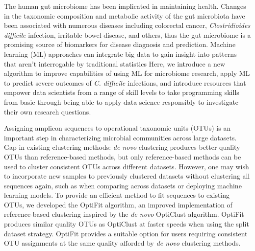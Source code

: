 The human gut microbiome has been implicated in maintaining health.
Changes in the taxonomic composition and metabolic activity of the gut
microbiota have been associated with numerous diseases including colorectal
cancer, \textit{Clostridioides difficile} infection, irritable bowel disease,
and others,
thus the gut microbiome is a promising source of biomarkers for disease
diagnosis and prediction.
Machine learning (ML) approaches can integrate big data to gain insight into
patterns that aren't interrogable by traditional statistics
Here, we introduce a new algorithm to improve capabilities of using ML for
microbiome research,
apply ML to predict severe outcomes of \textit{C. difficile} infections,
and introduce resources that empower data scientists from a range of skill
levels to take programming skills from basic through being able to apply data
science responsibly to investigate their own research questions.

Assigning amplicon sequences to operational taxonomic units (OTUs) is an
important step in characterizing microbial communities across large
datasets.
Gap in existing clustering methods: \textit{de novo} clustering produces better
quality OTUs than reference-based methods, but only reference-based methods can
be used to cluster consistent OTUs across different datasets.
However,
one may wish to incorporate new samples to previously clustered datasets
without clustering all sequences again, such as when comparing across
datasets or deploying machine learning models.
To provide an efficient method to fit sequences to existing OTUs, we
developed the OptiFit algorithm, an improved implementation
of reference-based clustering inspired by the \textit{de novo} OptiClust
algorithm.
OptiFit produces similar quality OTUs as
OptiClust at faster speeds when using the split dataset strategy.
OptiFit provides a suitable option for users requiring consistent OTU
assignments at the same quality afforded by \textit{de novo} clustering
methods.

